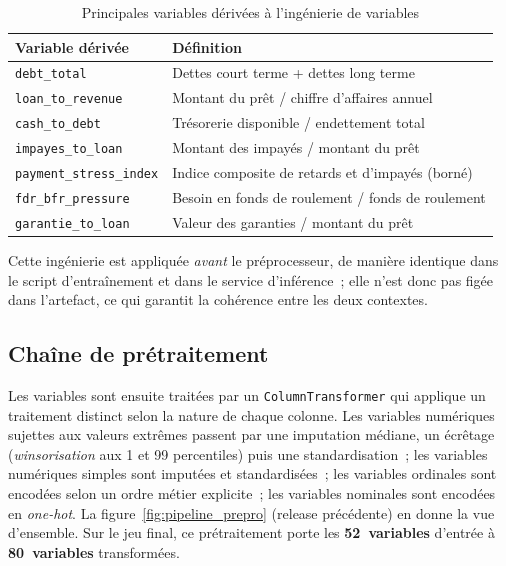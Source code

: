 \documentclass[a4paper,12pt,oneside]{report}
\begin{document}
\begin{table}[H]
\centering
\caption{Principales variables dérivées à l'ingénierie de variables}
\label{tab:features_engineered}
\renewcommand{\arraystretch}{1.3}
\begin{tabularx}{\textwidth}{@{}l Y@{}}
\toprule
\textbf{Variable dérivée} & \textbf{Définition} \\
\midrule
\texttt{debt\_total}            & Dettes court terme + dettes long terme \\
\texttt{loan\_to\_revenue}      & Montant du prêt / chiffre d'affaires annuel \\
\texttt{cash\_to\_debt}         & Trésorerie disponible / endettement total \\
\texttt{impayes\_to\_loan}      & Montant des impayés / montant du prêt \\
\texttt{payment\_stress\_index} & Indice composite de retards et d'impayés (borné) \\
\texttt{fdr\_bfr\_pressure}     & Besoin en fonds de roulement / fonds de roulement \\
\texttt{garantie\_to\_loan}     & Valeur des garanties / montant du prêt \\
\bottomrule
\end{tabularx}
\end{table}

\noindent
Cette ingénierie est appliquée \emph{avant} le préprocesseur, de manière identique dans le
script d'entraînement et dans le service d'inférence~; elle n'est donc pas figée dans
l'artefact, ce qui garantit la cohérence entre les deux contextes.

\subsection{Chaîne de prétraitement}

Les variables sont ensuite traitées par un \texttt{ColumnTransformer} qui applique un
traitement distinct selon la nature de chaque colonne. Les variables numériques sujettes
aux valeurs extrêmes passent par une imputation médiane, un écrêtage (\textit{winsorisation}
aux 1 et 99 percentiles) puis une standardisation~; les variables numériques
simples sont imputées et standardisées~; les variables ordinales sont encodées selon un ordre
métier explicite~; les variables nominales sont encodées en \textit{one-hot}. La
figure~\ref{fig:pipeline_prepro} (release précédente) en donne la vue d'ensemble. Sur le jeu
final, ce prétraitement porte les \textbf{52~variables} d'entrée à \textbf{80~variables}
transformées.
\end{document}
